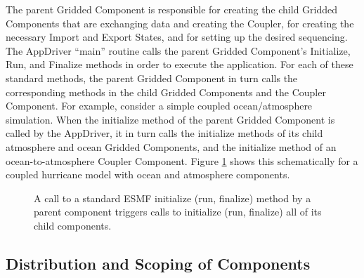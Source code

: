The parent Gridded Component is responsible for creating the child 
Gridded Components that are exchanging data and creating the Coupler, 
for creating the necessary Import and Export States, and for 
setting up the desired sequencing.  The AppDriver ``main'' routine
calls the parent Gridded Component's Initialize, Run, and Finalize 
methods in order to execute the application.  For each of these
standard methods, the parent Gridded Component in turn calls the 
corresponding methods in the child Gridded Components and the 
Coupler Component.  For example, consider a simple coupled 
ocean/atmosphere simulation.  When the initialize method of the 
parent Gridded Component is called by the AppDriver, it in turn 
calls the initialize methods of its child atmosphere and ocean 
Gridded Components, and the initialize method of an 
ocean-to-atmosphere Coupler Component.  Figure \ref{fig:appunit}
shows this schematically for a coupled hurricane model with ocean
and atmosphere components.

\begin{center}
\begin{figure}
\caption{A call to a standard ESMF initialize (run, finalize) method
by a parent component triggers calls to initialize (run, finalize) 
all of its child components.}
\label{fig:appunit}
\end{figure}
\end{center}

\subsection{Distribution and Scoping of Components}
\label{sec:scoping}

